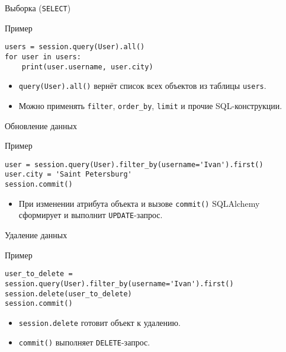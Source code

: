 \documentclass{beamer}
\begin{document}
\begin{frame}[fragile]{Выборка (\texttt{SELECT})}
	\begin{block}{Пример}
		\begin{verbatim}
users = session.query(User).all()
for user in users:
    print(user.username, user.city)
\end{verbatim}
	\end{block}

	\begin{itemize}
		\item \texttt{query(User).all()} вернёт список всех объектов из таблицы \texttt{users}.
		\item Можно применять \texttt{filter}, \texttt{order\_by}, \texttt{limit} и прочие SQL-конструкции.
	\end{itemize}
\end{frame}

\begin{frame}[fragile]{Обновление данных}
	\begin{block}{Пример}
		\begin{verbatim}
user = session.query(User).filter_by(username='Ivan').first()
user.city = 'Saint Petersburg'
session.commit()
\end{verbatim}
	\end{block}

	\begin{itemize}
		\item При изменении атрибута объекта и вызове \texttt{commit()} SQLAlchemy сформирует и выполнит \texttt{UPDATE}-запрос.
	\end{itemize}
\end{frame}

\begin{frame}[fragile]{Удаление данных}
	\begin{block}{Пример}
		\begin{verbatim}
user_to_delete = session.query(User).filter_by(username='Ivan').first()
session.delete(user_to_delete)
session.commit()
\end{verbatim}
	\end{block}

	\begin{itemize}
		\item \texttt{session.delete} готовит объект к удалению.
		\item \texttt{commit()} выполняет \texttt{DELETE}-запрос.
	\end{itemize}
\end{frame}
\end{document}
